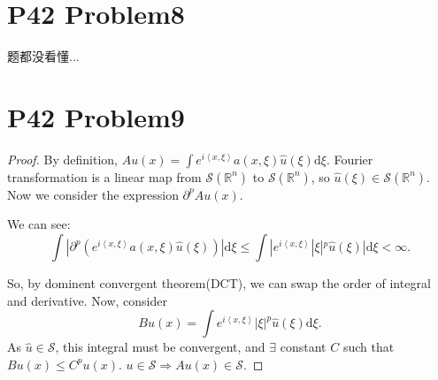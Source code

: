 \documentclass[a4paper]{ctexart}
\newcommand{\dif}{\mathrm{d}}
\newcommand{\innerprod}[2]{\left<#1,#2\right>}
\begin{document}
\section*{P42 Problem8}
题都没看懂...
\section*{P42 Problem9}
\begin{proof}
    By definition, $Au(x)=\int e^{i\innerprod{x}{\xi}}a(x,\xi)\hat{u}(\xi)\dif\xi$. Fourier transformation is a linear map from $\mathscr{S}(\mathbb{R}^{n})$ to $\mathscr{S}(\mathbb{R}^{n})$, so $\hat{u}(\xi)\in\mathscr{S}(\mathbb{R}^{n})$. Now we consider the expression 
    $\partial^{p}Au(x)$.

    We can see:
    \begin{equation}
        \int |\partial^{p}(e^{i\innerprod{x}{\xi}}a(x,\xi)\hat{u}(\xi))|\dif\xi\le
        \int |e^{i\innerprod{x}{\xi}}|\xi|^{p}\hat{u}(\xi)|\dif\xi<\infty.
    \end{equation}

    So, by dominent convergent theorem(DCT), we can swap the order of integral and derivative. Now, consider 
    \begin{equation}
        Bu(x)=\int e^{i\innerprod{x}{\xi}}|\xi|^{p}\hat{u}(\xi)\dif\xi.
    \end{equation}
    As $\hat{u}\in\mathscr{S}$, this integral must be convergent, and $\exists$ constant $C$ such that $Bu(x)\le C^{p}u(x)$. $u\in\mathscr{S}\Rightarrow Au(x)\in\mathscr{S}$.
\end{proof}
\end{document}
